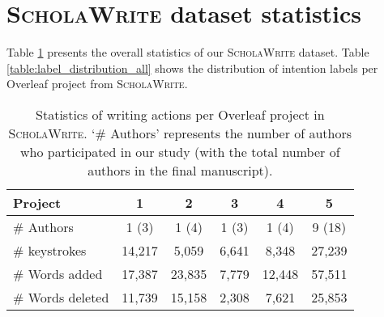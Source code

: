 

\section{\textsc{ScholaWrite} dataset statistics}

Table \ref{table:data-stat} presents the overall statistics of our \textsc{ScholaWrite} dataset. Table \ref{table:label_distribution_all} shows the distribution of intention labels per Overleaf project from \textsc{ScholaWrite}. 

\begin{table}[ht!]
    \centering
    \tiny
    \begin{tabular}{@{}l|c|c|c|c|c @{}} 
     \toprule
     Project & 1 & 2 & 3 & 4 & 5\\
     \midrule \midrule
    \# Authors  & 1 (3) & 1 (4) & 1 (3) & 1 (4) & 9 (18)\\
     \# keystrokes & 14,217 & 5,059 & 6,641 & 8,348 & 27,239 \\
     \# Words added & 17,387  & 23,835 & 7,779 & 12,448 & 57,511\\
     \# Words deleted & 11,739 & 15,158 & 2,308 & 7,621 & 25,853\\
     \bottomrule
    \end{tabular}
    \caption{Statistics of writing actions per Overleaf project in \textsc{ScholaWrite}. `\# Authors' represents the number of authors who participated in our study (with the total number of authors in the final manuscript). 
    } \label{table:data-stat}
\end{table}


